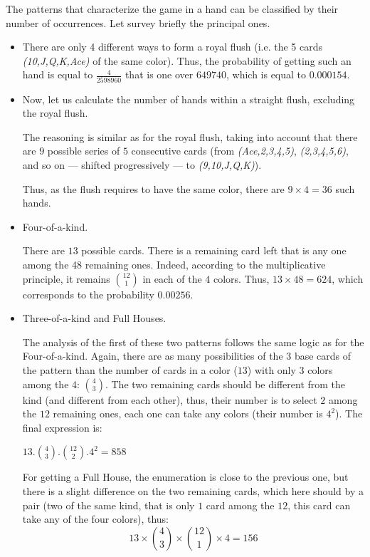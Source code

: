 The patterns that characterize the game in a hand can be classified by their number of occurrences.
Let survey briefly the principal ones.

\begin{itemize}
\item
There are only 4 different ways to form a royal flush (i.e. the 5 cards  \textit{(10,J,Q,K,Ace)} of the same color). 
Thus, the probability of getting such an hand is equal to $\frac{4}{2 598 960}$ that is one over $649740$, which is equal to $0.000154$.
\item
Now, let us calculate the number of hands within a straight flush, excluding the royal flush.

The reasoning is similar as for the royal flush, taking into account that there are $9$ possible series of $5$ consecutive cards
(from \textit{(Ace,2,3,4,5)}, \textit{(2,3,4,5,6)}, and so on --- shifted progressively --- to \textit{(9,10,J,Q,K)}).

Thus, as the flush requires to have the same color, there are $9 \times 4 = 36$ such hands. 
\item
Four-of-a-kind.

There are $13$ possible cards. There is a remaining card left that is any one among the 48 remaining ones.
Indeed, according to the multiplicative principle, it remains ${12 \choose 1}$ in each of the $4$ colors. 
Thus, $13 \times 48 = 624$, which corresponds to the probability $0.00256$.
\item
Three-of-a-kind and Full Houses.

The analysis of the first of these two patterns follows the same logic as for the Four-of-a-kind.
Again, there are as many possibilities of the $3$ base cards of the pattern than the number of cards in a color ($13$)
with only $3$ colors among the 4: ${4 \choose 3}$.
The two remaining cards should be different from the kind (and different from each other), 
thus, their number is to select $2$ among the $12$ remaining ones,
each one can take any colors (their number is $4^2$).
The final expression is:

$13.{4 \choose 3}.{12 \choose 2}.4^2 = 858$

For getting a Full House, the enumeration is close to the previous one, but there is a slight difference 
on the two remaining cards,
which here should by a pair (two of the same kind, that is only $1$ card among the $12$, 
this card can take any of the four colors),
thus:
\[ 13 \times {4 \choose 3} \times {12 \choose 1} \times 4 = 156 \]
\end{itemize}


